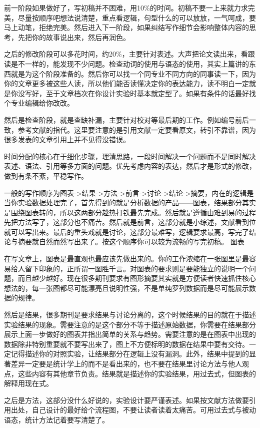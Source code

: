 \documentclass[]{tufte-book}
\begin{document}
前一阶段如果做好了，写初稿并不困难，用10\%的时间。初稿不要一上来就力求完美，尽量按顺序吧想法说清楚，重点看逻辑，句型什么的可以放放，一气呵成，要马上动笔，拒绝完美。然后进入下一阶段，如果纠结写作细节会影响整体内容的思考，先把你的故事说出来，然后再润色。

之后的修改阶段可以多花时间，约20\%，主要针对表述。大声把论文读出来，看跟读是不一样的，能发现不少问题。检查动词的使用与语态的使用，其实上篇讲的东西就是为这个阶段准备的。然后你可以找一个同专业不同方向的同事读一下，因为你的文章更多被这些人读，所以他们能否读懂决定你的表达能力，读不明白一定就是你没写好，至于文章档次在你设计实验时基本就定型了。如果有条件的话最好找个专业编辑给你改改。

然后是检查阶段，就是查缺补漏，主要针对校对等最后期的工作。例如编号前后一致，参考文献的指代。这里要注意的是引用文献一定要看原文，转引不靠谱，因为很多发表的文章引用上并不见得没错误。

时间分配的核心在于细化步骤，理清思路，一段时间解决一个问题而不是同时解决表述、语法、引用等多方面的问题。优先考虑内容的表达，然后才是形式的修改，做到有条不紊，平稳写作。

一般的写作顺序为图表-\textgreater 结果-\textgreater 方法-\textgreater 前言-\textgreater 讨论-\textgreater 结论-\textgreater 摘要，内在的逻辑是当你实验数据处理完了，首先得到的就是分析数据的产品------图表，结果部分其实是围绕图表转的，所以这两部分趁热打铁最先完成。然后就是遵循由难到易的过程先把方法写了，这部分也不痛苦。然后就是前言，这部分就是小综述，文献看到位就可以写出来。最后的重头戏就是讨论，这部分最难写，逻辑要求最高，写完了结论与摘要就自然而然写出来了。按这个顺序你可以较为流畅的写完初稿。
图表

在写文章上，图表是最直观也最应该先做出来的。你的工作浓缩在一张图里是最容易给人留下印象的，正所谓一图胜千言。对图表的要求则是要能独立的说明一个问题，而且越少越好。现在很多期刊要求有图形摘要其实就是方便读者快速抓住核心想法的，每一张图都尽可能漂亮且说明性强，不是单纯罗列数据而是尽可能展示数据的规律。

然后是结果，很多期刊是要求结果与讨论分离的，这个时候结果的目的就在于描述实验结果的现象。需要注意的是这个部分不等于描述原始数据，你需要在结果部分展示上面一步做好的图表并指出简单的关系与趋势。需要注意的是在图表中出现的数据除非特别重要就不要写出来了，图上不方便标明的数据在结果中要有交待。一定记得描述你的对照实验，让结果部分在逻辑上没有漏洞。此外，结果中提到的显著差异一定要是统计学上的而不是看出来的，也不要在结果里讨论方法与他人观点，这些内容有其他章节负责。结果就是描述你的实验结果，用过去式，但图表的解释用现在式。

之后是方法，这部分没什么好说的，实验设计要严谨表述。如果按文献方法做要引用出处，自己设计的最好给个流程图，不要让读者读着太痛苦。可用过去式与被动语态，统计方法记着要写清楚了。
\end{document}
